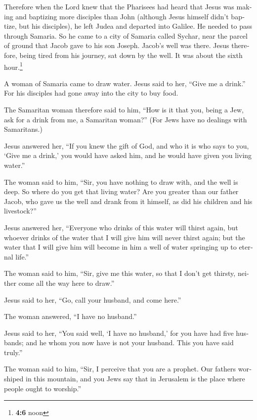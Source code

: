 \begin{paracol}{2}
\begin{otherlanguage}{english}
 Therefore when the Lord knew that the Pharisees had heard
that Jesus was making and baptizing more disciples than John
 (although Jesus himself didn't baptize, but his
disciples),  he left Judea and departed into Galilee.
 He needed to pass through Samaria.  So he
came to a city of Samaria called Sychar, near the parcel of ground that
Jacob gave to his son Joseph.  Jacob's well was there.
Jesus therefore, being tired from his journey, sat down by the well. It
was about the sixth hour.\footnote{\textbf{4:6} noon}

 A woman of Samaria came to draw water. Jesus said to her,
``Give me a drink.''  For his disciples had gone away into
the city to buy food.

 The Samaritan woman therefore said to him, ``How is it
that you, being a Jew, ask for a drink from me, a Samaritan woman?''
(For Jews have no dealings with Samaritans.)

 Jesus answered her, ``If you knew the gift of God, and
who it is who says to you, `Give me a drink,' you would have asked him,
and he would have given you living water.''

 The woman said to him, ``Sir, you have nothing to draw
with, and the well is deep. So where do you get that living water?
 Are you greater than our father Jacob, who gave us the
well and drank from it himself, as did his children and his livestock?''

 Jesus answered her, ``Everyone who drinks of this water
will thirst again,  but whoever drinks of the water that
I will give him will never thirst again; but the water that I will give
him will become in him a well of water springing up to eternal life.''

 The woman said to him, ``Sir, give me this water, so
that I don't get thirsty, neither come all the way here to draw.''

 Jesus said to her, ``Go, call your husband, and come
here.''

 The woman answered, ``I have no husband.''

Jesus said to her, ``You said well, `I have no husband,' 
for you have had five husbands; and he whom you now have is not your
husband. This you have said truly.''

 The woman said to him, ``Sir, I perceive that you are a
prophet.  Our fathers worshiped in this mountain, and you
Jews say that in Jerusalem is the place where people ought to worship.''


\end{otherlanguage}
\end{paracol}
